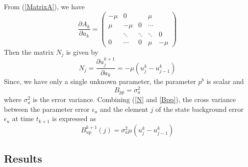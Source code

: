 \documentclass[a4,12pt]{article}
\numberwithin{equation}{section}
\begin{document}
From (\ref{MatrixA}), we have
\begin{equation}
\frac{\partial A_k}{\partial a_k} = 
\begin{pmatrix}
-\mu  & 0& & \mu\\
\mu  & -\mu & 0 & \cdots \\
 & \ddots &\ddots &\ddots&0\ \\
 0 & \cdots & 0 & \mu & -\mu 
\end{pmatrix} 
\end{equation}
Then the matrix $N_j$ is given by
\begin{equation}
    N_j = \frac{\partial u_j^{k+1}}{\partial a_k} = -\mu ( u_j^k - u_{j-1}^k)
\label{N}
\end{equation}
Since, we have only a single unknown parameter, the parameter $p^b$ is scalar and 
\begin{equation}
    B_{pp} = \sigma_a^2
\label{Bpp}
\end{equation}
where $\sigma_a^2$ is the error variance.
Combining (\ref{N} and \ref{Bpp}), the cross variance between the parameter error $\epsilon_a$ and the element $j$ of the state background error $\epsilon_u $ at time $t_{k+1}$ is expressed as
\begin{equation}
    B_{up}^{k+1}(j)  = \sigma_a^2  \mu ( u_j^k - u_{j-1}^k)
\end{equation}
\subsection{Results}
\end{document}
